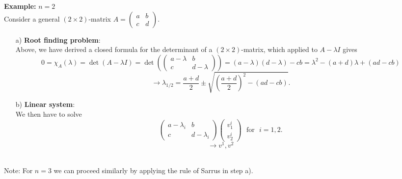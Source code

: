 \begin{frame}
	\textbf{Example:} $n = 2$\\
	Consider a general $(2 \times 2)$-matrix $A=\begin{pmatrix} a&b\\c&d\end{pmatrix}$.
	\begin{itemize}
		\item[a)] \textbf{\color{cyan}Root finding problem}:\\
		 Above, we have derived a closed formula for the determinant of a $(2 \times 2)$-matrix, which applied to $A-\lambda I$ gives
		\[
		0=\chi_A(\lambda)=\det(A -\lambda I)=\det\left(\begin{pmatrix} a-\lambda&b\\c&d-\lambda\end{pmatrix}\right) = (a-\lambda)(d-\lambda) - cb = \lambda^2 - (a+d)\lambda + (ad-cb)
		\]
		$$\rightarrow \lambda_{1/2} =   \frac{a+d}{2} \pm \sqrt{\left(\frac{a+d}{2}\right)^2 -(ad-cb) }.$$
		\item[b)] \textbf{\color{orange}Linear system}:\\ We then have to solve 
		$$\begin{pmatrix}
		a-\lambda_i&b\\c&d-\lambda_i
		\end{pmatrix} \begin{pmatrix}
		v_1^i\\v_2^i
		\end{pmatrix}~~~\text{for}~~~i=1,2 .$$
		$$\rightarrow  v^1, v^2$$
	\end{itemize}
	~\\
	Note: For $n=3$ we can proceed similarly by applying the rule of Sarrus in step a).
	
\end{frame}
